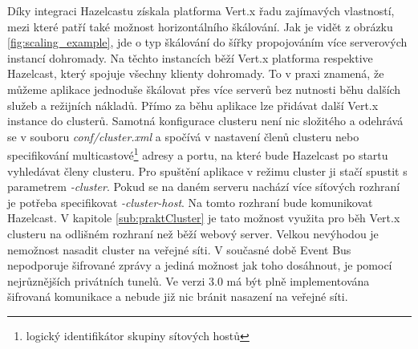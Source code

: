 Díky integraci Hazelcastu získala platforma Vert.x řadu zajímavých vlastností, mezi které patří také možnost horizontálního škálování. Jak je vidět z obrázku \ref{fig:scaling_example}, jde o typ škálování do šířky propojováním více serverových instancí dohromady. Na těchto instancích běží Vert.x platforma respektive Hazelcast, který spojuje všechny klienty dohromady. To v praxi znamená, že můžeme aplikace jednoduše škálovat přes více serverů bez nutnosti běhu dalších služeb a režijních nákladů. Přímo za běhu aplikace lze přidávat další Vert.x instance do clusterů. Samotná konfigurace clusteru není nic složitého a odehrává se v souboru \emph{conf/cluster.xml} a spočívá v nastavení členů clusteru nebo specifikování multicastové\footnote{logický identifikátor skupiny sítových hostů} adresy a portu, na které bude Hazelcast po startu vyhledávat členy clusteru. Pro spuštění aplikace v režimu cluster ji stačí spustit s parametrem \emph{-cluster}. Pokud se na daném serveru nachází více síťových rozhraní je potřeba specifikovat \emph{-cluster-host}. Na tomto rozhraní bude komunikovat Hazelcast. V kapitole \ref{sub:praktCluster} je tato možnost využita pro běh Vert.x clusteru na odlišném rozhraní než běží webový server.
Velkou nevýhodou je nemožnost nasadit cluster na veřejné síti. V současné době Event Bus nepodporuje šifrované zprávy a jediná možnost jak toho dosáhnout, je pomocí nejrůznějších privátních tunelů. Ve verzi 3.0 má být plně implementována šifrovaná komunikace a nebude již nic bránit nasazení na veřejné síti.

